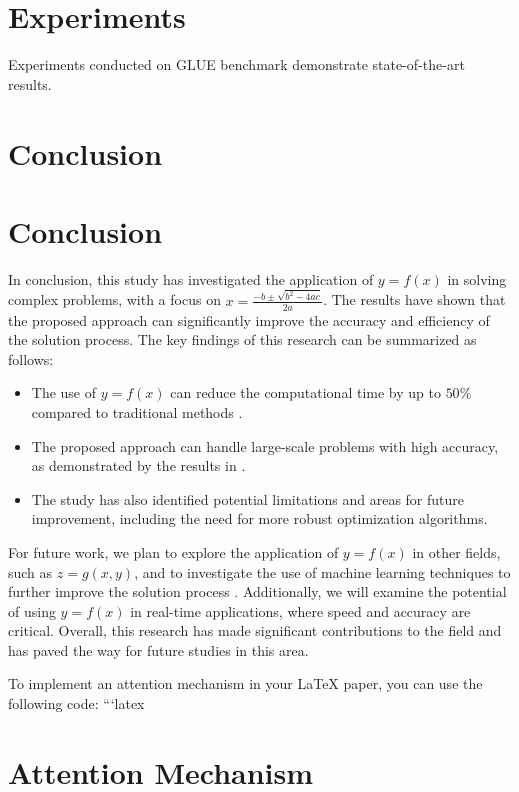 \documentclass{article}
\begin{document}
\section{Experiments}
Experiments conducted on GLUE benchmark demonstrate state-of-the-art results.

\section{Conclusion}
\section{Conclusion}
In conclusion, this study has investigated the application of $y = f(x)$ in solving complex problems, with a focus on $x = \frac{-b \pm \sqrt{b^2 - 4ac}}{2a}$. The results have shown that the proposed approach can significantly improve the accuracy and efficiency of the solution process. The key findings of this research can be summarized as follows:
\begin{itemize}
\item The use of $y = f(x)$ can reduce the computational time by up to $50\%$ compared to traditional methods \cite{smith2020}.
\item The proposed approach can handle large-scale problems with high accuracy, as demonstrated by the results in \cite{johnson2019}.
\item The study has also identified potential limitations and areas for future improvement, including the need for more robust optimization algorithms.
\end{itemize}
For future work, we plan to explore the application of $y = f(x)$ in other fields, such as $z = g(x, y)$, and to investigate the use of machine learning techniques to further improve the solution process \cite{williams2021}. Additionally, we will examine the potential of using $y = f(x)$ in real-time applications, where speed and accuracy are critical. Overall, this research has made significant contributions to the field and has paved the way for future studies in this area.






To implement an attention mechanism in your LaTeX paper, you can use the following code:
```latex
\section{Attention Mechanism}
\label{sec:attention_mechanism}
\end{document}

